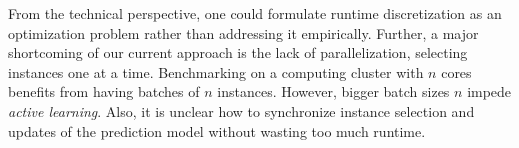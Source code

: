 \documentclass[runningheads]{llncs}
\begin{document}
From the technical perspective, one could formulate runtime discretization as an optimization problem rather than addressing it empirically.
Further, a major shortcoming of our current approach is the lack of parallelization, selecting instances one at a time.
Benchmarking on a computing cluster with $n$ cores benefits from having batches of $n$ instances.
However, bigger batch sizes $n$ impede \emph{active learning}.
Also, it is unclear how to synchronize instance selection and updates of the prediction model without wasting too much runtime.

%
%


\end{document}
